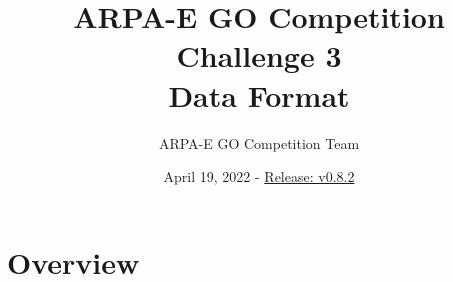 \documentclass{article}
\title{ARPA-E GO Competition Challenge 3 \\ Data Format}
\author{ARPA-E GO Competition Team}
\date{April 19, 2022 - \underline{Release: v0.8.2}}
\begin{document}
\maketitle




\section{Overview}
\end{document}
